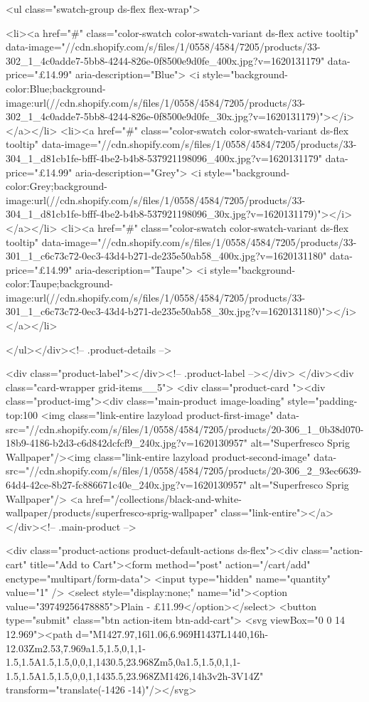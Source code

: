 {{{{{{{<ul class="swatch-group ds-flex flex-wrap">
        
<li><a href="#" class="color-swatch color-swatch-variant ds-flex active tooltip" data-image="//cdn.shopify.com/s/files/1/0558/4584/7205/products/33-302_1_4c0adde7-5bb8-4244-826e-0f8500e9d0fe_400x.jpg?v=1620131179" data-price="£14.99" aria-description="Blue">
              <i style="background-color:Blue;background-image:url(//cdn.shopify.com/s/files/1/0558/4584/7205/products/33-302_1_4c0adde7-5bb8-4244-826e-0f8500e9d0fe_30x.jpg?v=1620131179)"></i>
            </a></li>
<li><a href="#" class="color-swatch color-swatch-variant ds-flex tooltip" data-image="//cdn.shopify.com/s/files/1/0558/4584/7205/products/33-304_1_d81cb1fe-bfff-4be2-b4b8-537921198096_400x.jpg?v=1620131179" data-price="£14.99" aria-description="Grey">
              <i style="background-color:Grey;background-image:url(//cdn.shopify.com/s/files/1/0558/4584/7205/products/33-304_1_d81cb1fe-bfff-4be2-b4b8-537921198096_30x.jpg?v=1620131179)"></i>
            </a></li>
<li><a href="#" class="color-swatch color-swatch-variant ds-flex tooltip" data-image="//cdn.shopify.com/s/files/1/0558/4584/7205/products/33-301_1_c6c73c72-0ec3-43d4-b271-de235e50ab58_400x.jpg?v=1620131180" data-price="£14.99" aria-description="Taupe">
              <i style="background-color:Taupe;background-image:url(//cdn.shopify.com/s/files/1/0558/4584/7205/products/33-301_1_c6c73c72-0ec3-43d4-b271-de235e50ab58_30x.jpg?v=1620131180)"></i>
            </a></li>

      </ul></div><!-- .product-details -->

<div class="product-label"></div><!-- .product-label --></div>
          </div><div class="card-wrapper grid-items__5">
            <div class="product-card "><div class="product-img"><div class="main-product image-loading" style="padding-top:100%
      <img class="link-entire lazyload product-first-image" data-src="//cdn.shopify.com/s/files/1/0558/4584/7205/products/20-306_1_0b38d070-18b9-4186-b2d3-c6d842dcfcf9_240x.jpg?v=1620130957" alt="Superfresco Sprig Wallpaper"/><img class="link-entire lazyload product-second-image" data-src="//cdn.shopify.com/s/files/1/0558/4584/7205/products/20-306_2_93ec6639-64d4-42ce-8b27-fc886671c40e_240x.jpg?v=1620130957" alt="Superfresco Sprig Wallpaper"/>
      <a href="/collections/black-and-white-wallpaper/products/superfresco-sprig-wallpaper" class="link-entire"></a>
    </div><!-- .main-product -->
  
<div class="product-actions product-default-actions ds-flex"><div class="action-cart" title="Add to Cart"><form method="post" action="/cart/add" enctype="multipart/form-data">
            <input type="hidden" name="quantity" value="1" />
            <select style="display:none;" name="id"><option value="39749256478885">Plain - £11.99</option></select>
            <button type="submit" class="btn action-item btn-add-cart">
              <svg viewBox="0 0 14 12.969"><path d="M1427.97,16l1.06,6.969H1437L1440,16h-12.03Zm2.53,7.969a1.5,1.5,0,1,1-1.5,1.5A1.5,1.5,0,0,1,1430.5,23.968Zm5,0a1.5,1.5,0,1,1-1.5,1.5A1.5,1.5,0,0,1,1435.5,23.968ZM1426,14h3v2h-3V14Z" transform="translate(-1426 -14)"/></svg>

}}}}}}}
